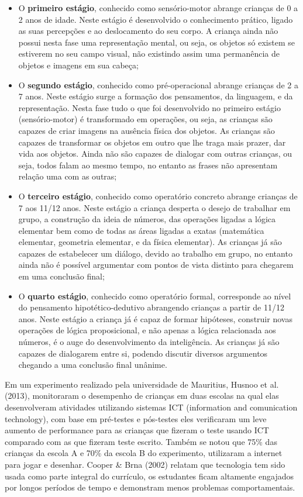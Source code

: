 \begin{itemize}
	\item O \textbf{primeiro estágio}, conhecido como sensório-motor abrange crianças de 0 a 2 anos de idade. Neste estágio é desenvolvido o conhecimento prático, ligado as suas percepções e ao deslocamento do seu corpo. A criança ainda não possui nesta fase uma representação mental, ou seja, os objetos só existem se estiverem no seu campo visual, não existindo assim uma permanência de objetos e imagens em sua cabeça;

	\item O \textbf{segundo estágio}, conhecido como pré-operacional abrange crianças de 2 a 7 anos. Neste estágio surge a formação dos pensamentos, da linguagem, e da representação. Nesta fase tudo o que foi desenvolvido no primeiro estágio (sensório-motor) é transformado em operações, ou seja, as crianças são capazes de criar imagens na ausência física dos objetos. As crianças são capazes de transformar os objetos em outro que lhe traga mais prazer, dar vida aos objetos. Ainda não são capazes de dialogar com outras crianças, ou seja, todos falam ao mesmo tempo, no entanto as frases não apresentam relação uma com as outras;

	\item O \textbf{terceiro estágio}, conhecido como operatório concreto abrange crianças de 7 aos 11/12 anos. Neste estágio a criança desperta o desejo de trabalhar em grupo, a construção da ideia de números, das operações ligadas a lógica elementar bem como de todas as áreas ligadas a exatas (matemática elementar, geometria elementar, e da física elementar). As crianças já são capazes de estabelecer um diálogo, devido ao trabalho em grupo, no entanto ainda não é possível argumentar com pontos de vista distinto para chegarem em uma conclusão final;

	\item O \textbf{quarto estágio}, conhecido como operatório formal, corresponde ao nível do pensamento hipotético-dedutivo abrangendo crianças a partir de 11/12 anos. Neste estágio a criança já é capaz de formar hipóteses, construir novas operações de lógica proposicional, e não apenas a lógica relacionada aos números, é o auge do desenvolvimento da inteligência. As crianças já são capazes de dialogarem entre si, podendo discutir diversos argumentos chegando a uma conclusão final unânime.
\end{itemize}

Em um experimento realizado pela universidade de Mauritius, Husnoo et al. (2013), monitoraram o desempenho de crianças em duas escolas na qual elas desenvolveram atividades utilizando sistemas ICT (information and comunication technology), com base em pré-testes e pós-testes eles verificaram um leve aumento de performance para as crianças que fizeram o teste usando ICT comparado com as que fizeram teste escrito. Também se notou que 75\% das crianças da escola A e 70\% da escola B do experimento, utilizaram a internet para jogar e desenhar. Cooper \& Brna (2002) relatam que tecnologia tem sido usada como parte integral do currículo, os estudantes ficam altamente engajados por longos períodos de tempo e demonstram menos problemas comportamentais. 

